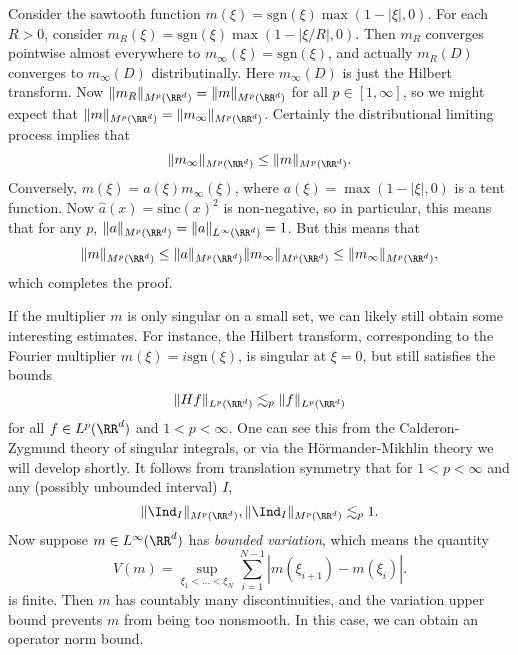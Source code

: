 \begin{example}
    Consider the sawtooth function $m(\xi) = \text{sgn}(\xi) \max(1 - |\xi|, 0)$. For each $R > 0$, consider $m_R(\xi) = \text{sgn}(\xi) \max(1 - |\xi/R|, 0)$. Then $m_R$ converges pointwise almost everywhere to $m_\infty(\xi) = \text{sgn}(\xi)$, and actually $m_R(D)$ converges to $m_\infty(D)$ distributinally. Here $m_\infty(D)$ is just the Hilbert transform. Now $\| m_R \|_{M^p(\RR^d)} = \| m \|_{M^p(\RR^d)}$ for all $p \in [1,\infty]$, so we might expect that $\| m \|_{M^p(\RR^d)} = \| m_\infty \|_{M^p(\RR^d)}$. Certainly the distributional limiting process implies that
    \[ \| m_\infty \|_{M^p(\RR^d)} \leq \| m \|_{M^p(\RR^d)}. \]
    Conversely, $m(\xi) = a(\xi) m_\infty(\xi)$, where $a(\xi) = \max(1 - |\xi|,0)$ is a tent function. Now $\widehat{a}(x) = \text{sinc}(x)^2$ is non-negative, so in particular, this means that for any $p$, $\| a \|_{M^p(\RR^d)} = \| a \|_{L^\infty(\RR^d)} = 1$. But this means that
    \[ \| m \|_{M^p(\RR^d)} \leq \| a \|_{M^p(\RR^d)} \| m_\infty \|_{M^p(\RR^d)} \leq \| m_\infty \|_{M^p(\RR^d)}, \]
    which completes the proof.
\end{example}

If the multiplier $m$ is only singular on a small set, we can likely still obtain some interesting estimates. For instance, the Hilbert transform, corresponding to the Fourier multiplier $m(\xi) = i \text{sgn}(\xi)$, is singular at $\xi = 0$, but still satisfies the bounds
%
\[ \| Hf \|_{L^p(\RR^d)} \lesssim_p \| f \|_{L^p(\RR^d)} \]
%
for all $f \in L^p(\RR^d)$ and $1 < p < \infty$. One can see this from the Calderon-Zygmund theory of singular integrals, or via the H\"{o}rmander-Mikhlin theory we will develop shortly. It follows from translation symmetry that for $1 < p < \infty$ and any (possibly unbounded interval) $I$,
%
\[ \| \Ind_{I} \|_{M^p(\RR^d)}, \| \Ind_{I} \|_{M^p(\RR^d)} \lesssim_p 1. \]
%
Now suppose $m \in L^\infty(\RR^d)$ has \emph{bounded variation}, which means the quantity
%
\[ V(m) = \sup_{\xi_1 < \dots < \xi_N} \sum_{i = 1}^{N-1} |m(\xi_{i+1}) - m(\xi_i)|. \]
%
is finite. Then $m$ has countably many discontinuities, and the variation upper bound prevents $m$ from being too nonsmooth. In this case, we can obtain an operator norm bound.

